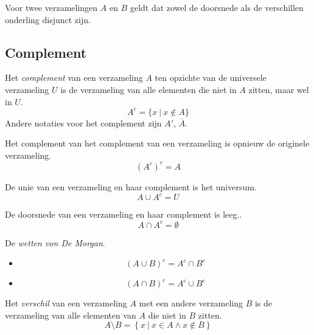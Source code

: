 \documentclass[main.tex]{subfiles}
\begin{document}
\begin{pr}
  Voor twee verzamelingen $A$ en $B$ geldt dat zowel de doorsnede als de verschillen onderling disjunct zijn.

\end{pr}

\subsection{Complement}
\label{sec:complement}

\begin{de}
  Het \emph{complement} van een verzameling $A$ ten opzichte van de universele verzameling $U$ is de verzameling van alle elementen die niet in $A$ zitten, maar wel in $U$.
  \[ A^{c} = \{ x\ |\ x \not\in A \} \]
  Andere notaties voor het complement zijn $A'$, $\overline{A}$. 
\end{de}

\begin{st}
  Het complement van het complement van een verzameling is opnieuw de originele verzameling.
  \[ (A^{c})^{c} = A\]

\end{st}

\begin{st}
  De unie van een verzameling en haar complement is het universum.
  \[ A \cup A^{c} = U \]

\end{st}

\begin{st}
  De doorsnede van een verzameling en haar complement is leeg..
  \[ A \cap A^{c} = \emptyset \]

\end{st}

\begin{st}
  De \emph{wetten von De Morgan}.
  \begin{itemize}
  \item \[ (A \cup B)^{c} = A^{c} \cap B^{c} \]
  \item \[ (A \cap B)^{c} = A^{c} \cup B^{c} \]
  \end{itemize}

\end{st}

\begin{de}
  Het \emph{verschil} van een verzameling $A$ met een andere verzameling $B$ is de verzameling van alle elementen van $A$ die niet in $B$ zitten.
  \[ A \setminus B = \left\{ x\ |\ x \in A \wedge x \not\in B \right\} \]
\end{de}
\end{document}
